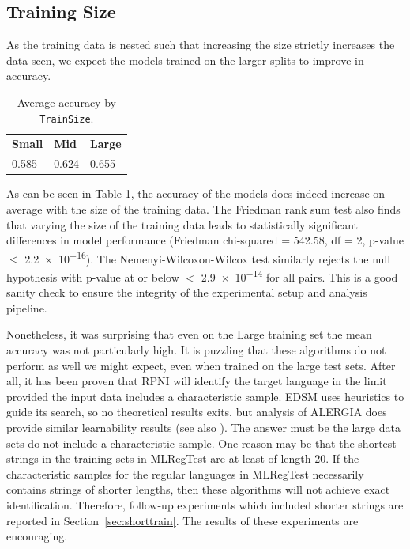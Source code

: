 \documentclass[twoside,11pt]{article}
\newcommand{\ttt}[1]{\texttt{#1}}
\begin{document}
\subsection{Training Size}
As the training data is nested such that increasing the size strictly increases the data seen, we expect the models trained on the larger splits to improve in accuracy.

\begin{table}[ht]
  \centering
  \begin{tabular}{lll}
    \toprule
    \textbf{Small} & \textbf{Mid} & \textbf{Large} \\
    0.585          & 0.624        & 0.655          \\
    \bottomrule
  \end{tabular}
  \caption{Average accuracy by \ttt{TrainSize}.}
  \label{tab:train-size}
\end{table}

As can be seen in Table \ref{tab:train-size}, the accuracy of the models does indeed increase on average with the size of the training data. 
The Friedman rank sum test also finds that varying the size of the training data leads to statistically significant differences in model performance (Friedman chi-squared = 542.58, df = 2, p-value $<$ \num{2.2e-16}). 
The Nemenyi-Wilcoxon-Wilcox test similarly rejects the null hypothesis with p-value at or below $<$ \num{2.9e-14} for all pairs. 
This is a good sanity check to ensure the integrity of the experimental setup and analysis pipeline.

Nonetheless, it was surprising that even on the Large training set the mean accuracy was not particularly high.
It is puzzling that these algorithms do not perform as well we might expect, even when trained on the large test sets. 
After all, it has been proven that RPNI will identify the target language in the limit provided the input data includes a characteristic sample. 
EDSM uses heuristics to guide its search, so no theoretical results exits, but analysis of ALERGIA does provide similar learnability results (see also \citet{Higuera-Thollard-2000,clarkthollard04}). 
The answer must be the large data sets do not include a characteristic sample. 
One reason may be that the shortest strings in the training sets in MLRegTest are at least of length 20. If the characteristic samples for the regular languages in MLRegTest necessarily contains strings of shorter lengths, then these algorithms will not achieve exact identification. 
Therefore, follow-up experiments which included shorter strings are reported in Section~\ref{sec:shorttrain}. 
The results of these experiments are encouraging.
\end{document}
